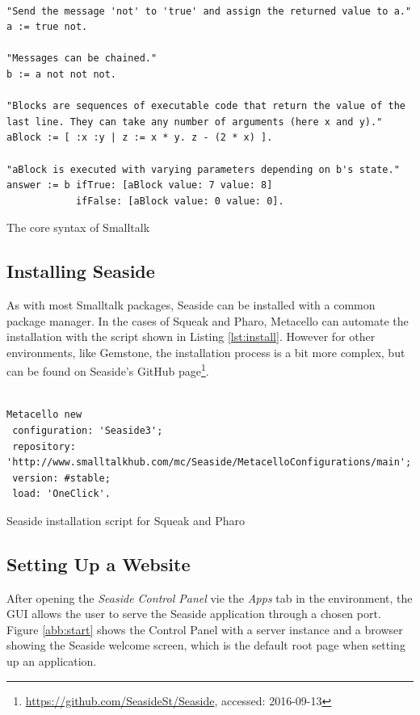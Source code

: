 \documentclass[a4paper,12pt,pagesize,headsepline,oribibl,titlepage]{scrartcl}
\begin{document}
\begin{listing}[]%
\begin{verbatim}

"Send the message 'not' to 'true' and assign the returned value to a."
a := true not.

"Messages can be chained."
b := a not not not.

"Blocks are sequences of executable code that return the value of the 
last line. They can take any number of arguments (here x and y)."
aBlock := [ :x :y | z := x * y. z - (2 * x) ].

"aBlock is executed with varying parameters depending on b's state."
answer := b ifTrue: [aBlock value: 7 value: 8] 
            ifFalse: [aBlock value: 0 value: 0].

\end{verbatim}
\caption{The core syntax of Smalltalk}
\label{lst:smalltalksyntax}
\end{listing}

\subsection{Installing Seaside}

As with most Smalltalk packages, Seaside can be installed with a common package manager. In the cases of Squeak and Pharo, Metacello can automate the installation with the script shown in Listing \ref{lst:install}. However for other environments, like Gemstone, the installation process is a bit more complex, but can be found on Seaside's GitHub page\footnote{\url{https://github.com/SeasideSt/Seaside}, accessed: 2016-09-13}.

\begin{listing}[]%
\begin{verbatim}

Metacello new
 configuration: 'Seaside3';
 repository: 'http://www.smalltalkhub.com/mc/Seaside/MetacelloConfigurations/main';
 version: #stable;
 load: 'OneClick'.

\end{verbatim}
\caption{Seaside installation script for Squeak and Pharo}
\label{lst:install}
\end{listing}

\subsection{Setting Up a Website}

After opening the \emph{Seaside Control Panel} vie the \emph{Apps} tab in the environment, the GUI allows the user to serve the Seaside application through a chosen port. Figure \ref{abb:start} shows the Control Panel with a server instance and a browser showing the Seaside welcome screen, which is the default root page when setting up an application.
\end{document}
